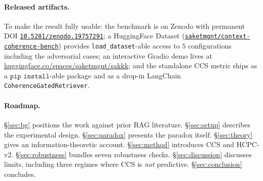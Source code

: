 \paragraph{Released artifacts.} To make the result fully usable: the
benchmark is on Zenodo with permanent DOI
\href{https://doi.org/10.5281/zenodo.19757291}{\texttt{10.5281/zenodo.19757291}};
a HuggingFace Dataset
(\href{https://huggingface.co/datasets/saketmgnt/context-coherence-bench}{\texttt{saketmgnt/context-coherence-bench}})
provides \texttt{load\_dataset}-able access to $5$ configurations
including the adversarial cases; an interactive Gradio demo lives at
\href{https://huggingface.co/spaces/saketmgnt/sakkk}{huggingface.co/spaces/saketmgnt/sakkk};
and the standalone CCS metric ships as a $\texttt{pip install}$-able
package and as a drop-in LangChain
\texttt{CoherenceGatedRetriever}.

\paragraph{Roadmap.} \S\ref{sec:bg} positions the work against prior
RAG literature. \S\ref{sec:setup} describes the experimental design.
\S\ref{sec:paradox} presents the paradox itself.
\S\ref{sec:theory} gives an information-theoretic account.
\S\ref{sec:method} introduces CCS and HCPC-v$2$.
\S\ref{sec:robustness} bundles seven robustness checks.
\S\ref{sec:discussion} discusses limits, including three regimes
where CCS is \emph{not} predictive. \S\ref{sec:conclusion}
concludes.
